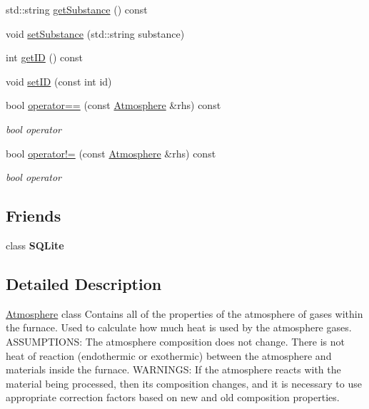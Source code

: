 \begin{DoxyCompactItemize}
\item 
std\+::string \hyperlink{class_atmosphere_a3ac0fb0d4fc92edc690e44b40b7018c2}{get\+Substance} () const
\item 
void \hyperlink{class_atmosphere_aa92f55a1f07304f3e57fdfb8ece65d82}{set\+Substance} (std\+::string substance)
\item 
int \hyperlink{class_atmosphere_a73b921f4d29a4a409488cbdb56c53ff7}{get\+ID} () const
\item 
void \hyperlink{class_atmosphere_a4698bf2580f7c24c8e0617d6455bfcac}{set\+ID} (const int id)
\item 
\mbox{\label{class_atmosphere_a6bddf411a91af4808f52cd69033a5c54}} 
bool \hyperlink{class_atmosphere_a6bddf411a91af4808f52cd69033a5c54}{operator==} (const \hyperlink{class_atmosphere}{Atmosphere} \&rhs) const
\begin{DoxyCompactList}\small\item\em bool operator \end{DoxyCompactList}\item 
\mbox{\label{class_atmosphere_a8f75154e49eb74561dc9053607f502f9}} 
bool \hyperlink{class_atmosphere_a8f75154e49eb74561dc9053607f502f9}{operator!=} (const \hyperlink{class_atmosphere}{Atmosphere} \&rhs) const
\begin{DoxyCompactList}\small\item\em bool operator \end{DoxyCompactList}\end{DoxyCompactItemize}
\subsection*{Friends}
\begin{DoxyCompactItemize}
\item 
\mbox{\label{class_atmosphere_ac7d22f3ca36435f73d55df60dc799e14}} 
class {\bfseries S\+Q\+Lite}
\end{DoxyCompactItemize}


\subsection{Detailed Description}
\hyperlink{class_atmosphere}{Atmosphere} class Contains all of the properties of the atmosphere of gases within the furnace. Used to calculate how much heat is used by the atmosphere gases. A\+S\+S\+U\+M\+P\+T\+I\+O\+NS\+: The atmosphere composition does not change. There is not heat of reaction (endothermic or exothermic) between the atmosphere and materials inside the furnace. W\+A\+R\+N\+I\+N\+GS\+: If the atmosphere reacts with the material being processed, then its composition changes, and it is necessary to use appropriate correction factors based on new and old composition properties. 

